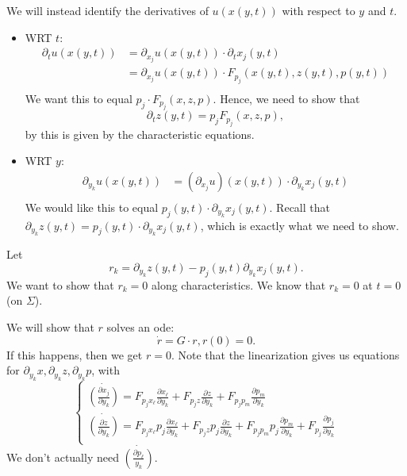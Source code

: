\documentclass[12pt]{scrartcl}
\begin{document}
We will instead identify the derivatives of $u(x(y, t))$ with respect to $y$ and $t$.
\begin{itemize}
\item WRT $t$:\begin{align*}
\partial_t u(x(y, t)) &= \partial_{x_j}u(x(y, t)) \cdot \partial_t x_j(y, t) \\
&= \partial_{x_j}u(x(y, t))\cdot F_{p_j}(x(y, t), z(y, t), p(y, t)) \\
\end{align*}
We want this to equal $p_j \cdot F_{p_j}(x, z, p)$.  Hence, we need to show that 
$$\partial_t z(y, t) = p_jF_{p_j}(x, z, p),$$
by this is given by the characteristic equations.
\item WRT $y$:
\begin{align*}
\partial_{y_k} u(x(y, t)) &= (\partial_{x_j} u)(x(y, t)) \cdot \partial_{y_k}x_j(y, t)\\
\end{align*}
We would like this to equal $p_j(y, t) \cdot \partial_{y_k}x_j(y, t)$.  Recall that 
$\partial_{y_k}z(y, t) = p_j(y, t) \cdot \partial_{y_k}x_j(y, t)$, which is exactly what we need to show.
\end{itemize} 
Let $$r_k = \partial_{y_k}z(y, t) - p_j( y, t) \partial_{y_k} x_j(y, t).$$  We want to show that $r_k = 0$ along characteristics.  We know that $r_k = 0$ at $t=0$(on $\Sigma$).  

We will show that $r$ solves an ode:
$$\dot r = G \cdot r, r(0) = 0.$$
If this happens, then we get $r=0$.  Note that the linearization gives us equations for $\partial_{y_k} x, \partial_{y_k} z, \partial_{y_k} p$, with 
$$\begin{cases}
\dot{\left (\frac{\partial x_j}{\partial y_k}\right )} = F_{p_j x_\ell}\frac{\partial x_\ell}{\partial y_k} + F_{p_j z} \frac{\partial z}{\partial y_k} + F_{p_jp_m} \frac{\partial p_m}{\partial y_k} \\
\dot{\left (\frac{\partial z}{\partial y_k}\right )} = F_{p_j x_\ell}p_j\frac{\partial x_\ell}{\partial y_k} + F_{p_j z}p_j \frac{\partial z}{\partial y_k} + F_{p_jp_m}p_j \frac{\partial p_m}{\partial y_k}  + F_{p_j}\frac{\partial p_j}{\partial y_k}\\
\end{cases}$$
We don't actually need $\dot{\left (\frac{\partial p_\ell}{y_k}\right )}$.
\end{document}
